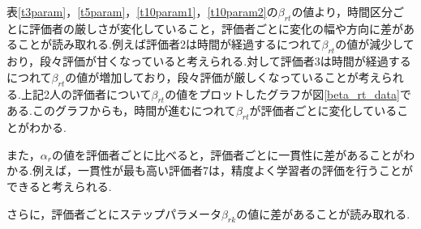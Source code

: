 \documentclass[a4paper，11pt，oneside，openany]{jsbook}
\begin{document}
表\ref{t3param}，\ref{t5param}，\ref{t10param1}，\ref{t10param2}の$\beta_{rt}$の値より，時間区分ごとに評価者の厳しさが変化していること，評価者ごとに変化の幅や方向に差があることが読み取れる.例えば評価者2は時間が経過するにつれて$\beta_{rt}$の値が減少しており，段々評価が甘くなっていると考えられる.対して評価者3は時間が経過するにつれて$\beta_{rt}$の値が増加しており，段々評価が厳しくなっていることが考えられる.上記2人の評価者について$\beta_{rt}$の値をプロットしたグラフが図\ref{beta_rt_data}である.このグラフからも，時間が進むにつれて$\beta_{rt}$が評価者ごとに変化していることがわかる.

また，$\alpha_r$の値を評価者ごとに比べると，評価者ごとに一貫性に差があることがわかる.例えば，一貫性が最も高い評価者7は，精度よく学習者の評価を行うことができると考えられる.

さらに，評価者ごとにステップパラメータ$\beta_{rk}$の値に差があることが読み取れる.
\end{document}
